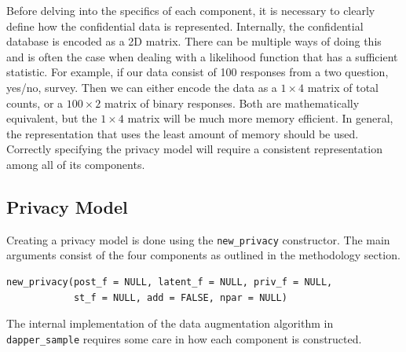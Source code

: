 Before delving into the specifics of each component, it is necessary to clearly
define how the confidential data is represented. Internally, the
confidential database is encoded as a 2D matrix. There can be multiple ways
of doing this and is often the case when dealing with a likelihood function
that has a sufficient statistic. For example, if our data consist
of 100 responses from a two question, yes/no, survey. Then we can either encode
the data as a \(1 \times 4\) matrix of total counts, or a \(100 \times 2\) matrix of binary responses. Both are mathematically
equivalent, but the \(1 \times 4\) matrix will be much more memory efficient.
In general, the representation that uses the least amount of memory should be
used. Correctly specifying the privacy model will require a consistent
representation among all of its components.

\hypertarget{privacy-model}{%
\subsection{Privacy Model}\label{privacy-model}}

Creating a privacy model is done using the \texttt{new\_privacy} constructor. The
main arguments consist of the four components as outlined in the methodology
section.

\begin{verbatim}
new_privacy(post_f = NULL, latent_f = NULL, priv_f = NULL,
            st_f = NULL, add = FALSE, npar = NULL)
\end{verbatim}

The internal implementation of the data augmentation algorithm in \texttt{dapper\_sample} requires
some care in how each component is constructed.

